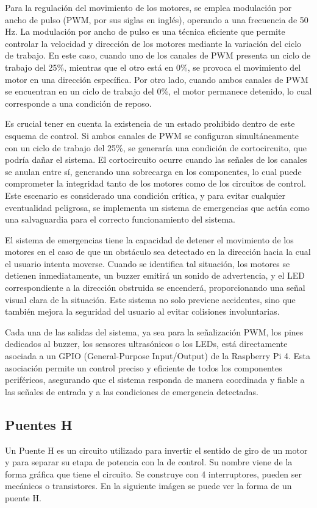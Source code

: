 \documentclass{article}
\begin{document}
Para la regulación del movimiento de los motores, se emplea modulación por ancho de pulso (PWM, por sus siglas en inglés), operando a una frecuencia de 50 Hz. La modulación por ancho de pulso es una técnica eficiente que permite controlar la velocidad y dirección de los motores mediante la variación del ciclo de trabajo. En este caso, cuando uno de los canales de PWM presenta un ciclo de trabajo del 25\%, mientras que el otro está en 0\%, se provoca el movimiento del motor en una dirección específica. Por otro lado, cuando ambos canales de PWM se encuentran en un ciclo de trabajo del 0\%, el motor permanece detenido, lo cual corresponde a una condición de reposo.

Es crucial tener en cuenta la existencia de un estado prohibido dentro de este esquema de control. Si ambos canales de PWM se configuran simultáneamente con un ciclo de trabajo del 25\%, se generaría una condición de cortocircuito, que podría dañar el sistema. El cortocircuito ocurre cuando las señales de los canales se anulan entre sí, generando una sobrecarga en los componentes, lo cual puede comprometer la integridad tanto de los motores como de los circuitos de control. Este escenario es considerado una condición crítica, y para evitar cualquier eventualidad peligrosa, se implementa un sistema de emergencias que actúa como una salvaguardia para el correcto funcionamiento del sistema.

El sistema de emergencias tiene la capacidad de detener el movimiento de los motores en el caso de que un obstáculo sea detectado en la dirección hacia la cual el usuario intenta moverse. Cuando se identifica tal situación, los motores se detienen inmediatamente, un buzzer emitirá un sonido de advertencia, y el LED correspondiente a la dirección obstruida se encenderá, proporcionando una señal visual clara de la situación. Este sistema no solo previene accidentes, sino que también mejora la seguridad del usuario al evitar colisiones involuntarias.

Cada una de las salidas del sistema, ya sea para la señalización PWM, los pines dedicados al buzzer, los sensores ultrasónicos o los LEDs, está directamente asociada a un GPIO (General-Purpose Input/Output) de la Raspberry Pi 4. Esta asociación permite un control preciso y eficiente de todos los componentes periféricos, asegurando que el sistema responda de manera coordinada y fiable a las señales de entrada y a las condiciones de emergencia detectadas.

\subsection{Puentes H}
Un Puente H es un circuito utilizado para invertir el sentido de giro de un motor y para separar su etapa de potencia con la de control. Su nombre viene de la forma gráfica que tiene el circuito. Se construye con 4 interruptores, pueden ser mecánicos o transistores. En la siguiente imágen se puede ver la forma de un puente H.
\end{document}
